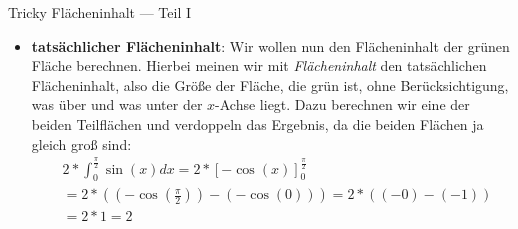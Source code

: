 \begin{bla}{Tricky Flächeninhalt --- Teil I}
\begin{itemize}
    \item \textbf{tatsächlicher Flächeninhalt}: Wir wollen nun den Flächeninhalt der grünen Fläche berechnen. Hierbei meinen wir mit \emph{Flächeninhalt} den tatsächlichen Flächeninhalt, also die Größe der Fläche, die grün ist, ohne Berücksichtigung, was über und was unter der $x$-Achse liegt. Dazu berechnen wir eine der beiden Teilflächen und verdoppeln das Ergebnis, da die beiden Flächen ja gleich groß sind:
    \begin{equation*}
      \begin{split}
        & 2*\int_{0}^{\frac{\pi}{2}} \sin(x)dx = 2*{[-\cos(x)]}_{0}^{\frac{\pi}{2}} \\
        &= 2*( (-\cos(\frac{\pi}{2})) - (-\cos(0)) ) = 2*( (-0)-(-1) ) \\
        &= 2*1=2
      \end{split}
    \end{equation*}
  \end{itemize}
\end{bla}



